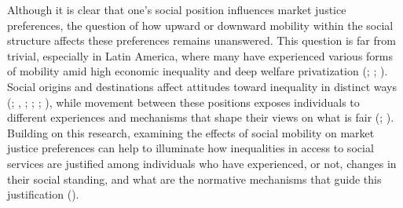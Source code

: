 \documentclass[
  13pt,
]{article}
\begin{document}
Although it is clear that one's social position influences market
justice preferences, the question of how upward or downward mobility
within the social structure affects these preferences remains
unanswered. This question is far from trivial, especially in Latin
America, where many have experienced various forms of mobility amid high
economic inequality and deep welfare privatization
(;
; ).
Social origins and destinations affect attitudes toward inequality in
distinct ways (;
,
;
; ; ), while
movement between these positions exposes individuals to different
experiences and mechanisms that shape their views on what is fair
(;
). Building on this
research, examining the effects of social mobility on market justice
preferences can help to illuminate how inequalities in access to social
services are justified among individuals who have experienced, or not,
changes in their social standing, and what are the normative mechanisms
that guide this justification ().
\end{document}
